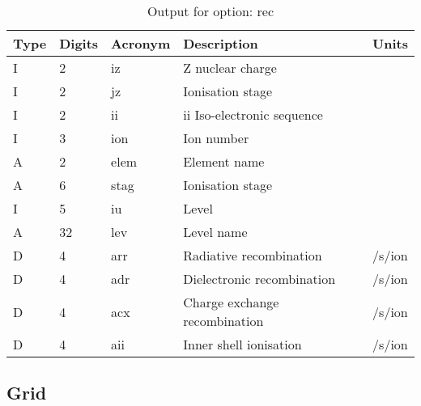 \begin{table}[!p]
\caption{Output for option: rec}
\label{tabout:rec}
\begin{tabular}{lllll}
\hline
Type & Digits & Acronym & Description & Units \\ 
\hline
I &  2 & iz   & Z nuclear charge                 &                  \\
I &  2 & jz   & Ionisation stage                 &                  \\
I &  2 & ii   & ii Iso-electronic sequence       &                  \\
I &  3 & ion  & Ion number                       &                  \\
A &  2 & elem & Element name                     &                  \\
A &  6 & stag & Ionisation stage                 &                  \\
I &  5 & iu   & Level                            &                  \\
A & 32 & lev  & Level name                       &                  \\
D &  4 & arr  & Radiative recombination          & /s/ion           \\
D &  4 & adr  & Dielectronic recombination       & /s/ion           \\
D &  4 & acx  & Charge exchange recombination    & /s/ion           \\
D &  4 & aii  & Inner shell ionisation           & /s/ion           \\
\hline
\end{tabular}
\end{table}

\subsection{Grid}

